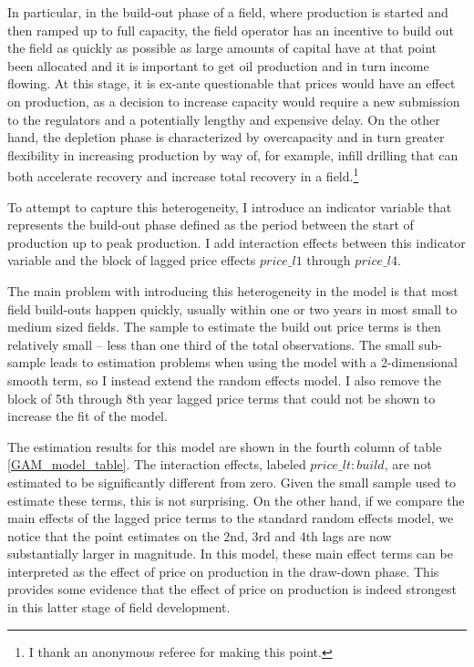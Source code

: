 \documentclass[12pt]{article}
\begin{document}
In particular, in the build-out phase of a field, where production is started and then ramped up to full capacity, the field operator has an incentive to build out the field as quickly as possible as large amounts of capital have at that point been allocated and it is important to get oil production and in turn income flowing. At this stage, it is ex-ante questionable that prices would have an effect on production, as a decision to increase capacity would require a new submission to the regulators and a potentially lengthy and expensive delay. On the other hand, the depletion phase is characterized by overcapacity and in turn greater flexibility in increasing production by way of, for example, infill drilling that can both accelerate recovery and increase total recovery in a field.\footnote{I thank an anonymous referee for making this point.}

To attempt to capture this heterogeneity, I introduce an indicator variable that represents the build-out phase defined as the period between the start of production up to peak production. I add interaction effects between this indicator variable and the block of lagged price effects $price\_l1$ through $price\_l4$.

The main problem with introducing this heterogeneity in the model is that most field build-outs happen quickly, usually within one or two years in most small to medium sized fields. The sample to estimate the build out price terms is then relatively small -- less than one third of the total observations. The small sub-sample leads to estimation problems when using the model with a 2-dimensional smooth term, so I instead extend the random effects model. I also remove the block of 5th through 8th year lagged price terms that could not be shown to increase the fit of the model.

The estimation results for this model are shown in the fourth column of table \ref{GAM_model_table}. The interaction effects, labeled $price\_lt:build$, are not estimated to be significantly different from zero. Given the small sample used to estimate these terms, this is not surprising. On the other hand, if we compare the main effects of the lagged price terms to the standard random effects model, we notice that the point estimates on the 2nd, 3rd and 4th lags are now substantially larger in magnitude. In this model, these main effect terms can be interpreted as the effect of price on production in the draw-down phase. This provides some evidence that the effect of price on production is indeed strongest in this latter stage of field development.
\end{document}
